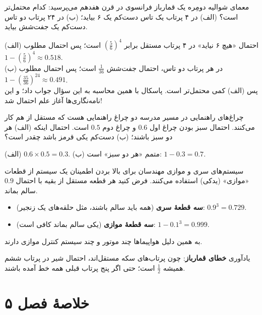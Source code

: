 \begin{example}[label=hs:ex:demere]{معمای شوالیه دومِره}
یک قمارباز فرانسوی در قرن هفدهم می‌پرسید: کدام محتمل‌تر است؟ (الف) در ۴ پرتاب یک تاس دست‌کم یک ۶ بیاید؛ (ب) در ۲۴ پرتاب دو تاس دست‌کم یک جفت‌شش بیاید.
\begin{solution}
(الف) احتمال «هیچ ۶ نیاید» در ۴ پرتاب مستقل برابر $(\tfrac56)^4$ است؛ پس احتمال مطلوب $1-(\tfrac56)^4\approx0.518$.\\
(ب) در هر پرتاب دو تاس، احتمال جفت‌شش $\tfrac1{36}$ است؛ پس احتمال مطلوب $1-(\tfrac{35}{36})^{24}\approx0.491$.\\
پس (الف) کمی محتمل‌تر است. پاسکال با همین محاسبه به این سؤال جواب داد؛ و این نامه‌نگاری‌ها آغاز علم احتمال شد!
\end{solution}
\end{example}

\begin{example}[label=hs:ex:lights]{چراغ‌های راهنمایی}
در مسیر مدرسه دو چراغ راهنمایی هست که مستقل از هم کار می‌کنند. احتمال سبز بودن چراغ اول $0.6$ و چراغ دوم $0.5$ است. احتمال اینکه (الف) هر دو سبز باشند؛ (ب) دست‌کم یکی قرمز باشد چقدر است؟
\begin{solution}
(الف) $0.6\times0.5=0.3$. \quad (ب) متمم «هر دو سبز» است: $1-0.3=0.7$.
\end{solution}
\end{example}

\begin{moreinfo}{سیستم‌های سری و موازی}
مهندسان برای بالا بردن اطمینان یک سیستم از قطعات «موازی» (یدکی) استفاده می‌کنند. فرض کنید هر قطعه مستقل از بقیه با احتمال $0.9$ سالم بماند.
\begin{itemize}
  \item \textbf{سه قطعهٔ سری} (همه باید سالم باشند، مثل حلقه‌های یک زنجیر): $0.9^3=0.729$.
  \item \textbf{سه قطعهٔ موازی} (یکی سالم بماند کافی است): $1-0.1^3=0.999$.
\end{itemize}
به همین دلیل هواپیماها چند موتور و چند سیستم کنترل موازی دارند.
\end{moreinfo}

\begin{warning}
یادآوری \textbf{خطای قمارباز}: چون پرتاب‌های سکه مستقل‌اند، احتمال شیر در پرتاب ششم همیشه $\tfrac12$ است؛ حتی اگر پنج پرتاب قبلی همه خط آمده باشند.
\end{warning}

\section*{خلاصهٔ فصل ۵}


